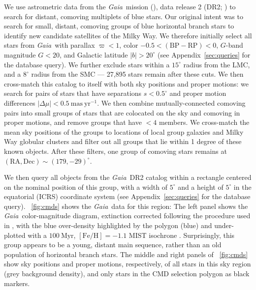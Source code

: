 \documentclass[twocolumn]{aastex62}
\newcommand{\acronym}[1]{{\small{#1}}}
\newcommand{\gaia}{\textsl{Gaia}}
\newcommand{\DR}[1]{\acronym{DR#1}}
\newcommand{\masyr}{\ensuremath{\textrm{mas}~\textrm{yr}^{-1}}}
\newcommand{\feh}{\ensuremath{[\textrm{Fe} / \textrm{H}]}}
\newcommand{\bprp}{\ensuremath{\textrm{BP} - \textrm{RP}}}
\begin{document}
We use astrometric data from the \gaia\ mission (\citealt{Prusti:2016}), data release 2 (\DR{2}; \citealt{Gaia-Collaboration:2018, Lindegren:2018}) to search for distant, comoving multiplets of blue stars.
Our original intent was to search for small, distant, comoving groups of blue horizontal branch stars to identify new candidate satellites of the Milky Way.
We therefore initially select all stars from \gaia\ with parallax $\varpi < 1$, color $-0.5 < (\bprp) < 0$, $G$-band magnitude $G < 20$, and Galactic latitude $|b| > 20^\circ$ (see Appendix~\ref{sec:queries} for the database query).
We further exclude stars within a $15^\circ$ radius from the LMC, and a $8^\circ$ radius from the SMC --- 27,895 stars remain after these cuts.
We then cross-match this catalog to itself with both sky positions and proper motions: we search for pairs of stars that have separations $s < 0.5^\circ$ and proper motion differences $|\Delta \mu| < 0.5~\masyr$.
We then combine mutually-connected comoving pairs into small groups of stars that are colocated on the sky and comoving in proper motions, and remove groups that have $<4$ members.
We cross-match the mean sky positions of the groups to locations of local group galaxies \citep{McConnachie:2012} and Milky Way globular clusters \citep[2010 edition;][]{Harris:1996} and filter out all groups that lie within 1 degree of these known objects.
After these filters, one group of comoving stars remains at $(\textrm{RA}, \textrm{Dec}) \sim (179, -29)^\circ$.

We then query all objects from the \gaia\ \DR{2} catalog within a rectangle centered on the nominal position of this group, with a width of $5^\circ$ and a height of $5^\circ$ in the equatorial (ICRS) coordinate system (see Appendix~\ref{sec:queries} for the database query).
\figurename~\ref{fig:cmds} shows the \gaia\ data for this region:
The left panel shows the \gaia\ color-magnitude diagram, extinction corrected following the procedure used in \citet{Danielski:2018}, with the blue over-density highlighted by the polygon (blue) and under-plotted with a $100~\textrm{Myr}$, $\feh = -1.1$ \acronym{MIST} isochrone \citep[red line;][]{Dotter:2016, Choi:2016, Paxton:2011, Paxton:2013, Paxton:2015}.
Surprisingly, this group appears to be a young, distant main sequence, rather than an old population of horizontal branch stars.
The middle and right panels of \figurename~\ref{fig:cmds} show sky positions and proper motions, respectively, of all stars in this sky region (grey background density), and only stars in the CMD selection polygon as black markers.
\end{document}

